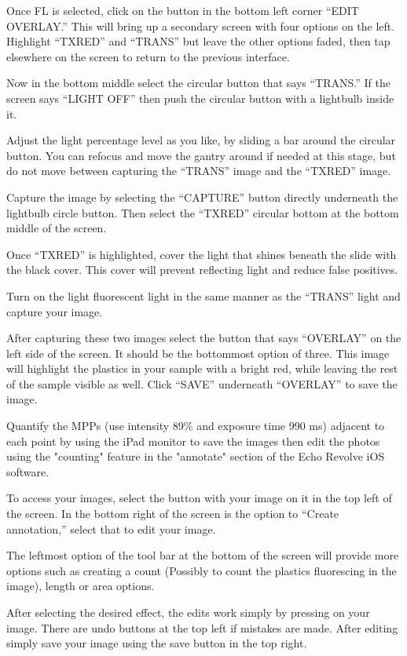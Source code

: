\documentclass[12pt]{../SOP4_alpha}\usepackage[]{graphicx}\usepackage[]{color}
\begin{document}
\NP Once FL is selected, click on the button in the bottom left corner ``EDIT OVERLAY.'' This will bring up a secondary screen with four options on the left. Highlight ``TXRED'' and “TRANS” but leave the other options faded, then tap elsewhere on the screen to return to the previous interface.

\NP Now in the bottom middle select the circular button that says ``TRANS.'' If the screen says ``LIGHT OFF'' then push the circular button with a lightbulb inside it. 

\NP Adjust the light percentage level as you like, by sliding a bar around the circular button. You can refocus and move the gantry around if needed at this stage, but do not move between capturing the ``TRANS'' image and the ``TXRED'' image. 

\NP Capture the image by selecting the ``CAPTURE'' button directly underneath the lightbulb circle button. Then select the ``TXRED'' circular bottom at the bottom middle of the screen.

\NP Once ``TXRED'' is highlighted, cover the light that shines beneath the slide with the black cover. This cover will prevent reflecting light and reduce false positives. 

\NP Turn on the light fluorescent light in the same manner as the ``TRANS'' light and capture your image. 

\NP After capturing these two images select the button that says ``OVERLAY'' on the left side of the screen. It should be the bottommost option of three. This image will highlight the plastics in your sample with a bright red, while leaving the rest of the sample visible as well. Click ``SAVE'' underneath ``OVERLAY'' to save the image.

\NP Quantify the MPPs (use intensity 89\% and exposure time 990 ms) adjacent to each point by using the iPad monitor to save the images then edit the photos using the "counting" feature in the "annotate" section of the Echo Revolve iOS software.

\NP To access your images, select the button with your image on it in the top left of the screen. In the bottom right of the screen is the option to ``Create annotation,'' select that to edit your image. 

\NP The leftmost option of the tool bar at the bottom of the screen will provide more options such as creating a count (Possibly to count the plastics fluorescing in the image), length or area options. 

\NP After selecting the desired effect, the edits work  simply by pressing on your image. There are undo buttons at the top left if mistakes are made. After editing simply save your image using the save button in the top right.
\end{document}
